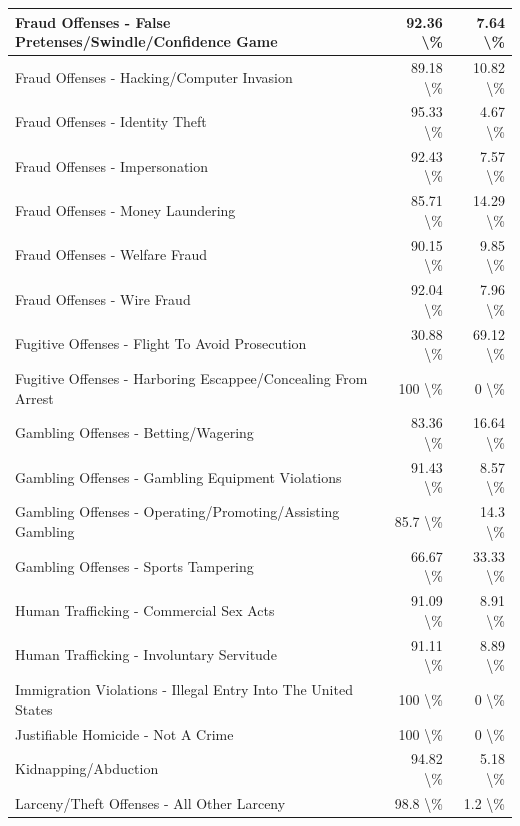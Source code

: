 \documentclass[
]{krantz}
\begin{document}
\begin{longtable}[t]{l|r|r}
Fraud Offenses - False Pretenses/Swindle/Confidence Game & 92.36 \textbackslash{}\% & 7.64 \textbackslash{}\%\\
\hline
Fraud Offenses - Hacking/Computer Invasion & 89.18 \textbackslash{}\% & 10.82 \textbackslash{}\%\\
\hline
Fraud Offenses - Identity Theft & 95.33 \textbackslash{}\% & 4.67 \textbackslash{}\%\\
\hline
Fraud Offenses - Impersonation & 92.43 \textbackslash{}\% & 7.57 \textbackslash{}\%\\
\hline
Fraud Offenses - Money Laundering & 85.71 \textbackslash{}\% & 14.29 \textbackslash{}\%\\
\hline
Fraud Offenses - Welfare Fraud & 90.15 \textbackslash{}\% & 9.85 \textbackslash{}\%\\
\hline
Fraud Offenses - Wire Fraud & 92.04 \textbackslash{}\% & 7.96 \textbackslash{}\%\\
\hline
Fugitive Offenses - Flight To Avoid Prosecution & 30.88 \textbackslash{}\% & 69.12 \textbackslash{}\%\\
\hline
Fugitive Offenses - Harboring Escappee/Concealing From Arrest & 100 \textbackslash{}\% & 0 \textbackslash{}\%\\
\hline
Gambling Offenses - Betting/Wagering & 83.36 \textbackslash{}\% & 16.64 \textbackslash{}\%\\
\hline
Gambling Offenses - Gambling Equipment Violations & 91.43 \textbackslash{}\% & 8.57 \textbackslash{}\%\\
\hline
Gambling Offenses - Operating/Promoting/Assisting Gambling & 85.7 \textbackslash{}\% & 14.3 \textbackslash{}\%\\
\hline
Gambling Offenses - Sports Tampering & 66.67 \textbackslash{}\% & 33.33 \textbackslash{}\%\\
\hline
Human Trafficking - Commercial Sex Acts & 91.09 \textbackslash{}\% & 8.91 \textbackslash{}\%\\
\hline
Human Trafficking - Involuntary Servitude & 91.11 \textbackslash{}\% & 8.89 \textbackslash{}\%\\
\hline
Immigration Violations - Illegal Entry Into The United States & 100 \textbackslash{}\% & 0 \textbackslash{}\%\\
\hline
Justifiable Homicide - Not A Crime & 100 \textbackslash{}\% & 0 \textbackslash{}\%\\
\hline
Kidnapping/Abduction & 94.82 \textbackslash{}\% & 5.18 \textbackslash{}\%\\
\hline
Larceny/Theft Offenses - All Other Larceny & 98.8 \textbackslash{}\% & 1.2 \textbackslash{}\%\\

\end{longtable}
\end{document}

